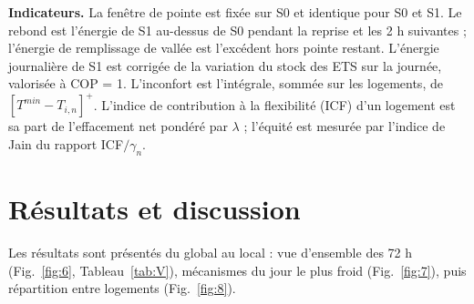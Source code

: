 \documentclass[conference]{IEEEtran}
\begin{document}
\textbf{Indicateurs.} La fenêtre de pointe est fixée sur S0 et identique pour S0 et S1. Le rebond est l'énergie de S1 au-dessus de S0 pendant la reprise et les 2 h suivantes ; l'énergie de remplissage de vallée est l'excédent hors pointe restant. L'énergie journalière de S1 est corrigée de la variation du stock des ETS sur la journée, valorisée à COP = 1. L'inconfort est l'intégrale, sommée sur les logements, de \([T^{min}-T_{i,n}]^+\). L'indice de contribution à la flexibilité (ICF) d'un logement est sa part de l'effacement net pondéré par \(\lambda\) ; l'équité est mesurée par l'indice de Jain \cite{Jain1984} du rapport ICF\(/\gamma_n\).

\section{Résultats et discussion}

Les résultats sont présentés du global au local : vue d'ensemble des 72 h (Fig.~\ref{fig:6}, Tableau~\ref{tab:V}), mécanismes du jour le plus froid (Fig.~\ref{fig:7}), puis répartition entre logements (Fig.~\ref{fig:8}).
\end{document}
